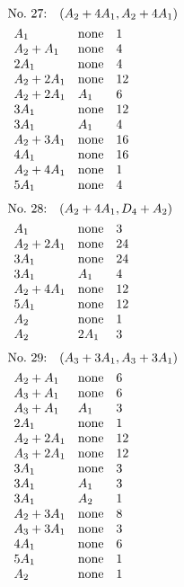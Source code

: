 %
%
\begin{align*}
&\hbox to 4cm {\textrm{No.~27:}\quad$(A_{2}+4A_{1}, A_{2}+4A_{1})$\hss}\\ 
&\begin{array}{lll}
A_{1} & \none & 1\\
A_{2}+A_{1} & \none & 4\\
2A_{1} & \none & 4\\
A_{2}+2A_{1} & \none & 12\\
A_{2}+2A_{1} & A_{1} & 6\\
3A_{1} & \none & 12\\
3A_{1} & A_{1} & 4\\
A_{2}+3A_{1} & \none & 16\\
4A_{1} & \none & 16\\
A_{2}+4A_{1} & \none & 1\\
5A_{1} & \none & 4\\
\end{array}
\end{align*}
%
%
\begin{align*}
&\hbox to 4cm {\textrm{No.~28:}\quad$(A_{2}+4A_{1}, D_{4}+A_{2})$\hss}\\ 
&\begin{array}{lll}
A_{1} & \none & 3\\
A_{2}+2A_{1} & \none & 24\\
3A_{1} & \none & 24\\
3A_{1} & A_{1} & 4\\
A_{2}+4A_{1} & \none & 12\\
5A_{1} & \none & 12\\
A_{2} & \none & 1\\
A_{2} & 2A_{1} & 3\\
\end{array}
\end{align*}
%
%
\begin{align*}
&\hbox to 4cm {\textrm{No.~29:}\quad$(A_{3}+3A_{1}, A_{3}+3A_{1})$\hss}\\ 
&\begin{array}{lll}
A_{2}+A_{1} & \none & 6\\
A_{3}+A_{1} & \none & 6\\
A_{3}+A_{1} & A_{1} & 3\\
2A_{1} & \none & 1\\
A_{2}+2A_{1} & \none & 12\\
A_{3}+2A_{1} & \none & 12\\
3A_{1} & \none & 3\\
3A_{1} & A_{1} & 3\\
3A_{1} & A_{2} & 1\\
A_{2}+3A_{1} & \none & 8\\
A_{3}+3A_{1} & \none & 3\\
4A_{1} & \none & 6\\
5A_{1} & \none & 1\\
A_{2} & \none & 1\\
\end{array}
\end{align*}
